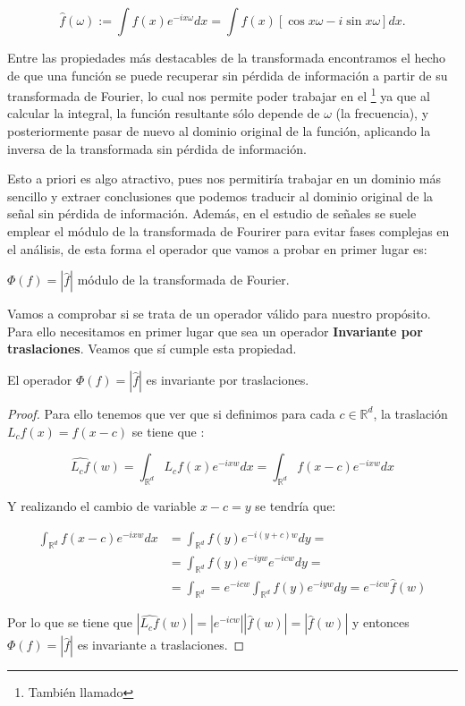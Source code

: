 \begin{equation}
\widehat{f}(\omega):= \int{f(x)e^{-ix\omega}dx}=\int{f(x)\left[\cos{x\omega} -i\sin{x\omega}\right]dx}.
\end{equation}

\noindent Entre las propiedades más destacables de la transformada encontramos el hecho de que una función se puede recuperar sin pérdida de información a partir de su transformada de Fourier, lo cual nos permite poder trabajar en el \footnote{También llamado } ya que al calcular la integral, la función resultante sólo depende de $\omega$ (la frecuencia), y posteriormente pasar de nuevo al dominio original de la función, aplicando la inversa de la transformada sin pérdida de información.

\medskip

\noindent Esto a priori es algo atractivo, pues nos permitiría trabajar en un dominio más sencillo y extraer conclusiones que podemos traducir al dominio original de la señal sin pérdida de información. Además, en el estudio de señales se suele emplear el módulo de la transformada de Fourirer para evitar fases complejas en el análisis, de esta forma el operador que vamos a probar en primer lugar es: 

\begin{definicion}
$\Phi(f)=|\widehat{f}|$ módulo de la transformada de Fourier. 
\end{definicion}

\noindent Vamos a comprobar si se trata de un operador válido para nuestro propósito. Para ello necesitamos en primer lugar que sea un operador \textbf{Invariante por traslaciones}. Veamos  que sí cumple esta propiedad.

\begin{lema} \label{lema::invarianza_traslaciones}
    El operador $\Phi(f)=|\widehat{f}|$ es invariante por traslaciones.
\end{lema}

\begin{proof}
    \noindent Para ello tenemos que ver que si definimos para cada $c \in \mathbb{R}^d$, la traslación $L_cf(x)=f(x-c)$ se tiene que :  
    
    $$\widehat{L_cf}(w)=\int_{\mathbb{R}^d}{L_cf(x) e^{-ixw} dx}=\int_{\mathbb{R}^d}{f(x-c)e^{-ixw}dx}$$
    
    \noindent Y realizando el cambio de variable $x-c=y$ se tendría que: 
    
    \begin{align*}
        \int_{\mathbb{R}^d}{f(x-c)e^{-ixw}dx} &= \int_{\mathbb{R}^d}{f(y)e^{-i(y+c)w}dy}= \\      &=\int_{\mathbb{R}^d}{f(y)e^{-iyw}e^{-icw}dy}= \\ &=\int_{\mathbb{R}^d}=e^{-icw}\int_{\mathbb{R}^d}{f(y)e^{-iyw}dy}=e^{-icw}\widehat{f}(w)
    \end{align*}
    
    \noindent Por lo que se tiene que $|\widehat{L_cf}(w)|=|e^{-icw}| |\widehat{f}(w)|=|\widehat{f}(w)|$ y entonces $\Phi(f)=|\widehat{f}|$ es invariante a traslaciones. \qedhere
\end{proof}

